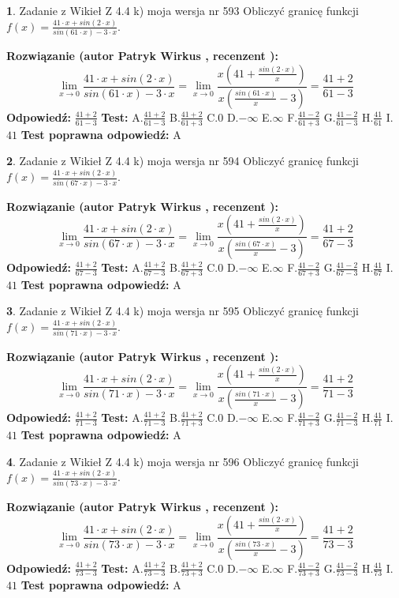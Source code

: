 \documentclass[12pt, a4paper]{article}
\theoremstyle{definition} %
\newtheorem{zad}{}
\newcommand{\zadStart}[1]{\begin{zad}#1\newline}
\newcommand{\zadStop}{\end{zad}}
\newcommand{\rozwStart}[2]{\noindent \textbf{Rozwiązanie (autor #1 , recenzent #2): }\newline}
\newcommand{\rozwStop}{\newline}
\newcommand{\odpStart}{\noindent \textbf{Odpowiedź:}\newline}
\newcommand{\odpStop}{\newline}
\newcommand{\testStart}{\noindent \textbf{Test:}\newline}
\newcommand{\testStop}{\newline}
\newcommand{\kluczStart}{\noindent \textbf{Test poprawna odpowiedź:}\newline}
\newcommand{\kluczStop}{\newline}
\begin{document}
\zadStart{Zadanie z Wikieł Z 4.4 k) moja wersja nr 593}
Obliczyć granicę funkcji $f(x)=\frac{41\cdot x +sin(2\cdot x)}{sin(61\cdot x) -3\cdot x}$.
\zadStop
\rozwStart{Patryk Wirkus}{}
$$\lim\limits_{x\to 0}\frac{41\cdot x +sin(2\cdot x)}{sin(61\cdot x) -3\cdot x}
=\lim\limits_{x\to 0}\frac{x(41+\frac{sin(2\cdot x)}{x})}{x(\frac{sin(61\cdot x)}{x}-3)}
=\frac{41+2}{61-3}$$
\rozwStop
\odpStart
$\frac{41+2}{61-3}$
\odpStop
\testStart
A.$\frac{41+2}{61-3}$
B.$\frac{41+2}{61+3}$
C.$0$
D.$-\infty$
E.$\infty$
F.$\frac{41-2}{61+3}$
G.$\frac{41-2}{61-3}$
H.$\frac{41}{61}$
I.$41$
\testStop
\kluczStart
A
\kluczStop



\zadStart{Zadanie z Wikieł Z 4.4 k) moja wersja nr 594}
Obliczyć granicę funkcji $f(x)=\frac{41\cdot x +sin(2\cdot x)}{sin(67\cdot x) -3\cdot x}$.
\zadStop
\rozwStart{Patryk Wirkus}{}
$$\lim\limits_{x\to 0}\frac{41\cdot x +sin(2\cdot x)}{sin(67\cdot x) -3\cdot x}
=\lim\limits_{x\to 0}\frac{x(41+\frac{sin(2\cdot x)}{x})}{x(\frac{sin(67\cdot x)}{x}-3)}
=\frac{41+2}{67-3}$$
\rozwStop
\odpStart
$\frac{41+2}{67-3}$
\odpStop
\testStart
A.$\frac{41+2}{67-3}$
B.$\frac{41+2}{67+3}$
C.$0$
D.$-\infty$
E.$\infty$
F.$\frac{41-2}{67+3}$
G.$\frac{41-2}{67-3}$
H.$\frac{41}{67}$
I.$41$
\testStop
\kluczStart
A
\kluczStop



\zadStart{Zadanie z Wikieł Z 4.4 k) moja wersja nr 595}
Obliczyć granicę funkcji $f(x)=\frac{41\cdot x +sin(2\cdot x)}{sin(71\cdot x) -3\cdot x}$.
\zadStop
\rozwStart{Patryk Wirkus}{}
$$\lim\limits_{x\to 0}\frac{41\cdot x +sin(2\cdot x)}{sin(71\cdot x) -3\cdot x}
=\lim\limits_{x\to 0}\frac{x(41+\frac{sin(2\cdot x)}{x})}{x(\frac{sin(71\cdot x)}{x}-3)}
=\frac{41+2}{71-3}$$
\rozwStop
\odpStart
$\frac{41+2}{71-3}$
\odpStop
\testStart
A.$\frac{41+2}{71-3}$
B.$\frac{41+2}{71+3}$
C.$0$
D.$-\infty$
E.$\infty$
F.$\frac{41-2}{71+3}$
G.$\frac{41-2}{71-3}$
H.$\frac{41}{71}$
I.$41$
\testStop
\kluczStart
A
\kluczStop



\zadStart{Zadanie z Wikieł Z 4.4 k) moja wersja nr 596}
Obliczyć granicę funkcji $f(x)=\frac{41\cdot x +sin(2\cdot x)}{sin(73\cdot x) -3\cdot x}$.
\zadStop
\rozwStart{Patryk Wirkus}{}
$$\lim\limits_{x\to 0}\frac{41\cdot x +sin(2\cdot x)}{sin(73\cdot x) -3\cdot x}
=\lim\limits_{x\to 0}\frac{x(41+\frac{sin(2\cdot x)}{x})}{x(\frac{sin(73\cdot x)}{x}-3)}
=\frac{41+2}{73-3}$$
\rozwStop
\odpStart
$\frac{41+2}{73-3}$
\odpStop
\testStart
A.$\frac{41+2}{73-3}$
B.$\frac{41+2}{73+3}$
C.$0$
D.$-\infty$
E.$\infty$
F.$\frac{41-2}{73+3}$
G.$\frac{41-2}{73-3}$
H.$\frac{41}{73}$
I.$41$
\testStop
\kluczStart
A
\kluczStop
\end{document}
